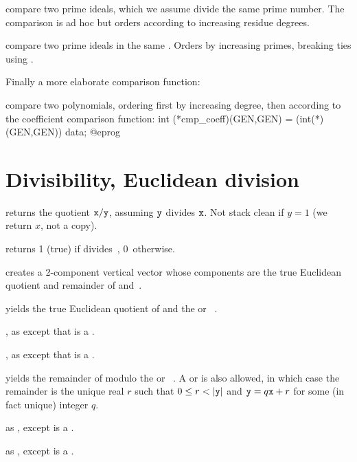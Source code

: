  compare two prime ideals, which
we assume divide the same prime number. The comparison is ad hoc but orders
according to increasing residue degrees.

 compare two prime ideals in the same
. Orders by increasing primes, breaking ties using
.

Finally a more elaborate comparison function:

 compare two polynomials,
ordering first by increasing degree, then according to the coefficient
comparison function:
\bprog
  int (*cmp_coeff)(GEN,GEN) = (int(*)(GEN,GEN)) data;
@eprog

\section{Divisibility, Euclidean division}

 returns the quotient ${\tt x} / {\tt y}$,
assuming ${\tt y}$ divides ${\tt x}$. Not stack clean if $y = 1$
(we return $x$, not a copy).

  returns 1 (true) if  divides~,
0~otherwise.

 creates a 2-component vertical
vector whose components are the true Euclidean quotient and remainder
of  and~.

 yields the true Euclidean
quotient of  and the  or ~.

, as 
except that  is a .

, as 
except that  is a .

 yields the remainder of 
modulo the  or ~. A  or  
is also allowed, in which case the remainder is the unique real $r$ such that
$0 \leq r < |{\tt y}|$ and ${\tt y} = q{\tt x} + r$ for some (in fact unique)
integer $q$.

 as , except  is
a .

 as , except  is
a .

